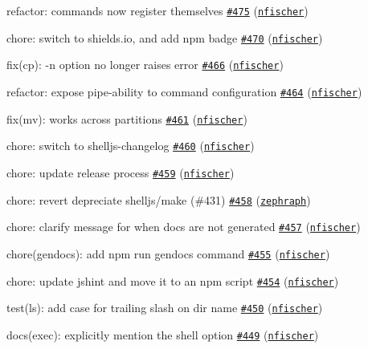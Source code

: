 \begin{DoxyItemize}
\item refactor\+: commands now register themselves \href{https://github.com/shelljs/shelljs/pull/475}{\tt \#475} (\href{https://github.com/nfischer}{\tt nfischer})
\item chore\+: switch to shields.\+io, and add npm badge \href{https://github.com/shelljs/shelljs/pull/470}{\tt \#470} (\href{https://github.com/nfischer}{\tt nfischer})
\item fix(cp)\+: -\/n option no longer raises error \href{https://github.com/shelljs/shelljs/pull/466}{\tt \#466} (\href{https://github.com/nfischer}{\tt nfischer})
\item refactor\+: expose pipe-\/ability to command configuration \href{https://github.com/shelljs/shelljs/pull/464}{\tt \#464} (\href{https://github.com/nfischer}{\tt nfischer})
\item fix(mv)\+: works across partitions \href{https://github.com/shelljs/shelljs/pull/461}{\tt \#461} (\href{https://github.com/nfischer}{\tt nfischer})
\item chore\+: switch to shelljs-\/changelog \href{https://github.com/shelljs/shelljs/pull/460}{\tt \#460} (\href{https://github.com/nfischer}{\tt nfischer})
\item chore\+: update release process \href{https://github.com/shelljs/shelljs/pull/459}{\tt \#459} (\href{https://github.com/nfischer}{\tt nfischer})
\item chore\+: revert depreciate shelljs/make (\#431) \href{https://github.com/shelljs/shelljs/pull/458}{\tt \#458} (\href{https://github.com/zephraph}{\tt zephraph})
\item chore\+: clarify message for when docs are not generated \href{https://github.com/shelljs/shelljs/pull/457}{\tt \#457} (\href{https://github.com/nfischer}{\tt nfischer})
\item chore(gendocs)\+: add {\ttfamily npm run gendocs} command \href{https://github.com/shelljs/shelljs/pull/455}{\tt \#455} (\href{https://github.com/nfischer}{\tt nfischer})
\item chore\+: update jshint and move it to an npm script \href{https://github.com/shelljs/shelljs/pull/454}{\tt \#454} (\href{https://github.com/nfischer}{\tt nfischer})
\item test(ls)\+: add case for trailing slash on dir name \href{https://github.com/shelljs/shelljs/pull/450}{\tt \#450} (\href{https://github.com/nfischer}{\tt nfischer})
\item docs(exec)\+: explicitly mention the {\ttfamily shell} option \href{https://github.com/shelljs/shelljs/pull/449}{\tt \#449} (\href{https://github.com/nfischer}{\tt nfischer})

\end{DoxyItemize}
